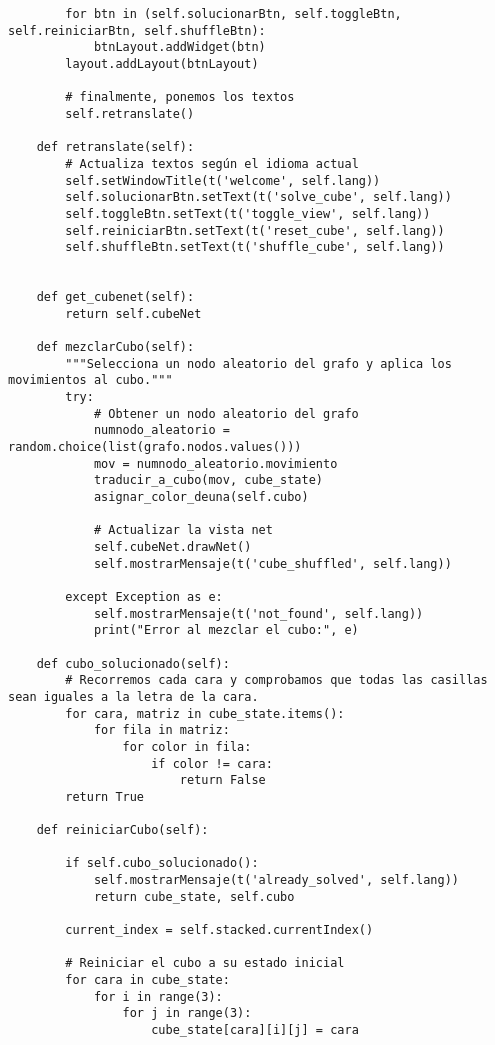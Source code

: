 \begin{lstlisting}
        for btn in (self.solucionarBtn, self.toggleBtn, self.reiniciarBtn, self.shuffleBtn):
            btnLayout.addWidget(btn)
        layout.addLayout(btnLayout)

        # finalmente, ponemos los textos
        self.retranslate()
        
    def retranslate(self):
        # Actualiza textos según el idioma actual
        self.setWindowTitle(t('welcome', self.lang))
        self.solucionarBtn.setText(t('solve_cube', self.lang))
        self.toggleBtn.setText(t('toggle_view', self.lang))
        self.reiniciarBtn.setText(t('reset_cube', self.lang))
        self.shuffleBtn.setText(t('shuffle_cube', self.lang))

    
    def get_cubenet(self):
        return self.cubeNet
    
    def mezclarCubo(self):
        """Selecciona un nodo aleatorio del grafo y aplica los movimientos al cubo."""
        try:
            # Obtener un nodo aleatorio del grafo
            numnodo_aleatorio = random.choice(list(grafo.nodos.values()))
            mov = numnodo_aleatorio.movimiento
            traducir_a_cubo(mov, cube_state)
            asignar_color_deuna(self.cubo)

            # Actualizar la vista net
            self.cubeNet.drawNet()
            self.mostrarMensaje(t('cube_shuffled', self.lang))
            
        except Exception as e:
            self.mostrarMensaje(t('not_found', self.lang))
            print("Error al mezclar el cubo:", e)
            
    def cubo_solucionado(self):
        # Recorremos cada cara y comprobamos que todas las casillas sean iguales a la letra de la cara.
        for cara, matriz in cube_state.items():
            for fila in matriz:
                for color in fila:
                    if color != cara:
                        return False
        return True
    
    def reiniciarCubo(self):
        
        if self.cubo_solucionado():
            self.mostrarMensaje(t('already_solved', self.lang))
            return cube_state, self.cubo
        
        current_index = self.stacked.currentIndex() 
        
        # Reiniciar el cubo a su estado inicial
        for cara in cube_state:
            for i in range(3):
                for j in range(3):
                    cube_state[cara][i][j] = cara
        

\end{lstlisting}
